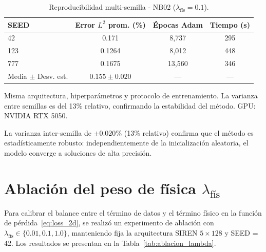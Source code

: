\begin{table}[htbp]
\centering
\begin{threeparttable}
\caption{Reproducibilidad multi-semilla - NB02 ($\lambda_\text{fís} = 0.1$).}
\label{tab:multiseed}
\begin{tabular}{lccc}
\toprule
SEED & Error $L^2$ prom. (\%) & Épocas Adam & Tiempo (s) \\
\midrule
42   & 0.171  & 8{,}737  & 295 \\
123  & 0.1264 & 8{,}012  & 448 \\
777  & 0.1675 & 13{,}560 & 346 \\
\midrule
Media $\pm$ Desv. est. & $0.155 \pm 0.020$ & — & — \\
\bottomrule
\end{tabular}
\begin{tablenotes}\small
    \item Misma arquitectura, hiperparámetros y protocolo de entrenamiento.
    La varianza entre semillas es del 13\% relativo, confirmando la
    estabilidad del método. GPU: NVIDIA RTX 5050.
\end{tablenotes}
\end{threeparttable}
\end{table}

La varianza inter-semilla de $\pm 0.020\%$ (13\% relativo) confirma que el
método es estadísticamente robusto: independientemente de la inicialización
aleatoria, el modelo converge a soluciones de alta precisión.

\section{Ablación del peso de física $\lambda_\text{fís}$}
\label{sec:ablacion}

Para calibrar el balance entre el término de datos y el término físico en la
función de pérdida~\eqref{eq:loss_2d}, se realizó un experimento de ablación
con $\lambda_\text{fís} \in \{0.01, 0.1, 1.0\}$, manteniendo fija la
arquitectura SIREN $5 \times 128$ y SEED = 42. Los resultados se presentan en
la Tabla~\ref{tab:ablacion_lambda}.

